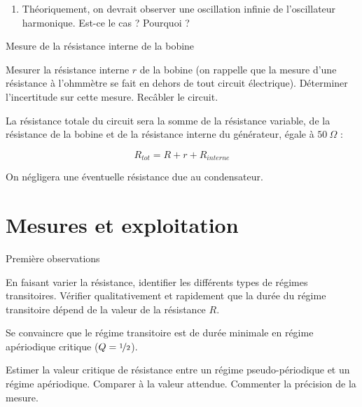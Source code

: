 \documentclass[a4paper,french,bookmarks]{article}
\begin{document}

\begin{enumerate}[resume]
    \item Théoriquement, on devrait observer une oscillation infinie de l’oscillateur harmonique. Est-ce le cas ? Pourquoi ?
    
\end{enumerate}

\begin{experience}{ Mesure de la résistance interne de la bobine}{}
    \begin{enumerate}
        \ithand Mesurer la résistance interne $r$ de la bobine (on rappelle que la mesure d’une résistance à l’ohmmètre se fait en dehors de tout circuit électrique). Déterminer l’incertitude sur cette mesure.
        \ithand Recâbler le circuit.
    \end{enumerate}
\end{experience}


La résistance totale du circuit sera la somme de la résistance variable, de la résistance de la bobine et de la résistance
interne du générateur, égale à $50 \ \Omega$ :

\begin{equation}
    R_{tot} = R + r + R_{interne}
\end{equation}

On négligera une éventuelle résistance due au condensateur.

\section{Mesures et exploitation}

\begin{experience}{Première observations}{}
    \begin{enumerate}
        \ithand En faisant varier la résistance, identifier les différents types de régimes transitoires. Vérifier qualitativement et rapidement que la durée du régime transitoire dépend de la valeur de la résistance $R$.
        
        \ithand Se convaincre que le régime transitoire est de durée minimale en régime apériodique critique ($Q = \nicefrac{1}{2}$).
        
        \ithand Estimer la valeur critique de résistance entre un régime pseudo-périodique et un régime apériodique. Comparer à la valeur attendue. Commenter la précision de la mesure.
    \end{enumerate}
\end{experience}
\end{document}
